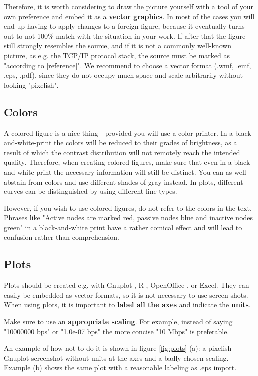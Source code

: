 Therefore, it is worth considering to draw the picture yourself with a tool
of your own preference and embed it as a \textbf{vector graphics}.
In most of the cases you will end up having to apply changes to a foreign figure, because it eventually turns out to not 100\% match with the situation in your work.
If after that the figure still strongly resembles the source, and if it is not a commonly well-known picture, as e.g. the TCP/IP protocol stack, the source must be marked as "according to [reference]". We recommend to choose
a vector format (.wmf, .emf, .eps, .pdf), since they do not occupy much space
and scale arbitrarily without looking "pixelish".


\subsection{Colors}
A colored figure is a nice thing - provided you will use a color printer. In a black-and-white-print the colors will be reduced to their grades of brightness, as a result of which the contrast distribution will not remotely reach the intended quality. Therefore, when creating colored figures, make sure that even in a black-and-white print the necessary information will still be distinct. You can as well abstain from colors and use different shades of gray instead. In plots, different curves can be distinguished by using different line types.

However, if you wish to use colored figures, do not refer to the colors in the text. Phrases like "Active nodes are marked red, passive nodes blue and inactive nodes green" in a black-and-white print have a rather comical effect and will lead to confusion rather than comprehension.


\subsection{Plots}
Plots should be created e.g. with Gnuplot \cite{gnuplot_homepage}, R \cite{r_homepage}, OpenOffice \cite{oo_homepage}, or Excel. They can easily be embedded as vector formats, so it is not necessary to use screen shots. When using plots, it is important to \textbf{label all the axes} and indicate the \textbf{units}.

Make sure to use an \textbf{appropriate scaling}. For example, instead of saying "10000000 bps" or "1.0e-07 bps" the more concise "10 Mbps" is preferable.

An example of how not to do it is shown in figure \ref{fig:plots} (a): a pixelish Gnuplot-screenshot without units at the axes and a badly chosen scaling. Example (b) shows the same plot with a reasonable labeling as .eps import.

